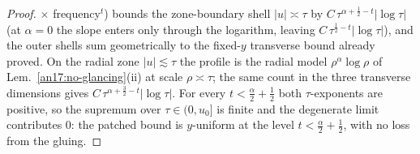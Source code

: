 \begin{proof}
$\times$ frequency$^{t}$) bounds the zone-boundary shell $|u|\asymp\tau$ by
$C\,\tau^{\alpha+\frac12-t}|\log\tau|$ (at $\alpha=0$ the slope enters only
through the logarithm, leaving $C\,\tau^{\frac12-t}|\log\tau|$), and the
outer shells sum geometrically to the fixed-$y$ transverse bound already
proved. On the radial zone $|u|\lesssim\tau$ the profile is the radial
model $\rho^\alpha\log\rho$ of Lem.~\ref{an17:no-glancing}(ii) at scale
$\rho\asymp\tau$; the same count in the three transverse dimensions gives
$C\,\tau^{\alpha+\frac32-t}|\log\tau|$. For every $t<\tfrac\alpha2+\tfrac12$
both $\tau$-exponents are positive, so the supremum over $\tau\in(0,u_0]$
is finite and the degenerate limit contributes $0$: the patched bound is
$y$-uniform at the level $t<\tfrac\alpha2+\tfrac12$, with no loss from the
gluing.
\end{proof}

